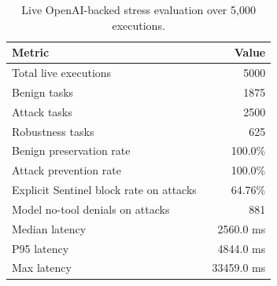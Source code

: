 \begin{table}[t]
\centering
\small
\renewcommand{\arraystretch}{1.12}
\setlength{\tabcolsep}{6pt}
\caption{Live OpenAI-backed stress evaluation over 5,000 executions.}
\label{tab:live_eval_stress_5k}
\begin{tabular}{@{}p{0.74\linewidth}r@{}}
\toprule
Metric & Value \\
\midrule
Total live executions & 5000 \\
Benign tasks & 1875 \\
Attack tasks & 2500 \\
Robustness tasks & 625 \\
\addlinespace
Benign preservation rate & 100.0\% \\
Attack prevention rate & 100.0\% \\
Explicit Sentinel block rate on attacks & 64.76\% \\
Model no-tool denials on attacks & 881 \\
\addlinespace
Median latency & 2560.0 ms \\
P95 latency & 4844.0 ms \\
Max latency & 33459.0 ms \\
\bottomrule
\end{tabular}
\end{table}
